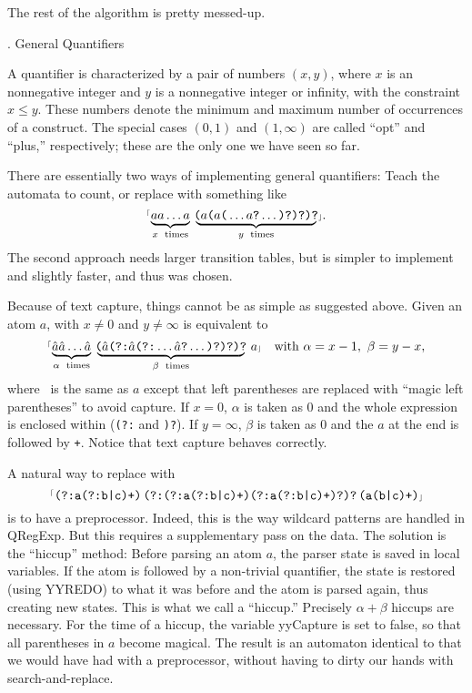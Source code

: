 The rest of the algorithm is pretty messed-up.

. General Quantifiers

A quantifier is characterized by a pair of numbers $(x, y)$, where $x$ is an nonnegative integer and $y$ is a nonnegative integer or infinity, with the constraint $x \le y$.  These numbers denote the minimum and maximum number of occurrences of a construct.  The special cases $(0, 1)$ and $(1, \infty)$ are called ``opt'' and ``plus,'' respectively; these are the only one we have seen so far.

There are essentially two ways of implementing general quantifiers:  Teach the automata to count, or replace  with something like $$\hbox{\rx{$\underbrace{\hbox{$aa$}\ldots\hbox{$a$\vphantom)}}_{x\rm\ times}\,\,\underbrace{\!\hbox{($a$($a$(}\ldots\hbox{$a$?}\ldots\hbox{)?)?)?}\!}_{y\rm\ times}\,$}.}$$  The second approach needs larger transition tables, but is simpler to implement and slightly faster, and thus was chosen.

Because of text capture, things cannot be as simple as suggested above.  Given an atom $a$,  with $x \ne 0$ and $y \ne \infty$ is equivalent to $$\hbox{\rx{$\underbrace{\hbox{\haha\haha}\ldots\hbox{\haha\vphantom)}}_{\alpha\rm\ times}\,\,\underbrace{\!\hbox{(\haha(?:\haha(?:}\ldots\hbox{\haha?}\ldots\hbox{)?)?)?}\!}_{\beta\rm\ times}\,\,a$}} \quad \hbox{with}\ \alpha = x - 1,\ \beta = y - x,$$ where \haha~is the same as $a$ except that left parentheses are replaced with ``magic left parentheses'' to avoid capture.  If $x = 0$, $\alpha$ is taken as 0 and the whole expression is enclosed within ({\tt (?:} and {\tt )?}).  If $y = \infty$, $\beta$ is taken as 0 and the $a$ at the end is followed by {\tt +}.  Notice that text capture behaves correctly.

A natural way to replace  with $$\hbox{{$^{\scriptscriptstyle\lceil}$\tt(?:a(?:b|c)+)$\,$(?:(?:a(?:b|c)+)(?:a(?:b|c)+)?)?$\,$(a(b|c)+)$\scriptscriptstyle\rfloor$}}$$ is to have a preprocessor.  Indeed, this is the way wildcard patterns are handled in {\sf QRegExp}.  But this requires a supplementary pass on the data.  The solution is the ``hiccup'' method:  Before parsing an atom $a$, the parser state is saved in local variables.  If the atom is followed by a non-trivial quantifier, the state is restored (using {\sf YYREDO}) to what it was before and the atom is parsed again, thus creating new states.  This is what we call a ``hiccup.''  Precisely $\alpha + \beta$ hiccups are necessary.  For the time of a hiccup, the variable {\sf yyCapture} is set to {\sf false}, so that all parentheses in $a$ become magical.  The result is an automaton identical to that we would have had with a preprocessor, without having to dirty our hands with search-and-replace.


